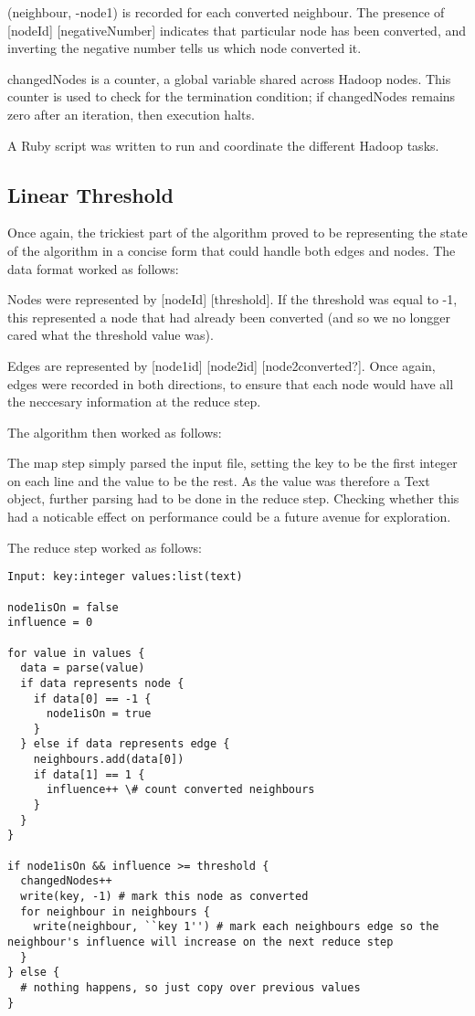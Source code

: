 (neighbour, -node1) is recorded for each converted neighbour. The presence of [nodeId] [negativeNumber] indicates that particular node has been converted, and inverting the negative number tells us which node converted it.

changedNodes is a counter, a global variable shared across Hadoop nodes. This counter is used to check for the termination condition; if changedNodes remains zero after an iteration, then execution halts.

A Ruby script was written to run and coordinate the different Hadoop tasks.

\subsection{Linear Threshold}

Once again, the trickiest part of the algorithm proved to be representing the state of the algorithm in a concise form that could handle both edges and nodes. The data format worked as follows:

Nodes were represented by [nodeId] [threshold]. If the threshold was equal to -1, this represented a node that had already been converted (and so we no longger cared what the threshold value was).

Edges are represented by [node1id] [node2id] [node2converted?]. Once again, edges were recorded in both directions, to ensure that each node would have all the neccesary information at the reduce step.

The algorithm then worked as follows:

The map step simply parsed the input file, setting the key to be the first integer on each line and the value to be the rest. As the value was therefore a Text object, further parsing had to be done in the reduce step. Checking whether this had a noticable effect on performance could be a future avenue for exploration.

The reduce step worked as follows:

\begin{verbatim}
Input: key:integer values:list(text)

node1isOn = false
influence = 0

for value in values {
  data = parse(value)
  if data represents node {
    if data[0] == -1 {
      node1isOn = true
    }
  } else if data represents edge {
    neighbours.add(data[0])
    if data[1] == 1 {
      influence++ \# count converted neighbours
    }
  }
}

if node1isOn && influence >= threshold {
  changedNodes++
  write(key, -1) # mark this node as converted
  for neighbour in neighbours {
    write(neighbour, ``key 1'') # mark each neighbours edge so the neighbour's influence will increase on the next reduce step
  }
} else {
  # nothing happens, so just copy over previous values
}
\end{verbatim}

